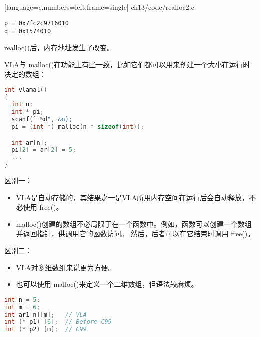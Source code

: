 \begin{frame}[fragile]
  
  [language=c,numbers=left,frame=single]
  {ch13/code/realloc2.c}
\end{frame}

\begin{frame}[fragile]
  \begin{lstlisting}[backgroundcolor=\color{red!20}] 
p = 0x7fc2c9716010
q = 0x1574010
\end{lstlisting}
{ realloc()}后，内存地址发生了改变。
\end{frame}



\begin{frame}[fragile]
  VLA与{ malloc()}在功能上有些一致，比如它们都可以用来创建一个大小在运行时决定的数组：
  \begin{lstlisting}[language=c,backgroundcolor=\color{red!20}]
int vlamal()
{
  int n;
  int * pi;
  scanf(``%d", &n);
  pi = (int *) malloc(n * sizeof(int));

  int ar[n];
  pi[2] = ar[2] = 5;
  ...
}    
  \end{lstlisting}
\end{frame}


\begin{frame}[fragile]
  区别一：\vspace{0.05in}

  \begin{itemize}
  \item VLA是自动存储的，其结果之一是VLA所用内存空间在运行后会自动释放，不必使用{ free()}。\\[0.1in]
  \item { malloc()}创建的数组不必局限于在一个函数中。例如，函数可以创建一个数组并返回指针，供调用它的函数访问。
    然后，后者可以在它结束时调用{ free()}。
  \end{itemize}
\end{frame}


\begin{frame}[fragile]
  区别二：\vspace{0.05in}

  \begin{itemize}
  \item  VLA对多维数组来说更为方便。  \\[0.1in]
  \item  也可以使用{ malloc()}来定义一个二维数组，但语法较麻烦。
  \end{itemize}

  \begin{lstlisting}[language=c,backgroundcolor=\color{red!20}]
int n = 5;
int m = 6;
int ar1[n][m];   // VLA
int (* p1) [6];  // Before C99
int (* p2) [m];  // C99    
  \end{lstlisting}
\end{frame}


